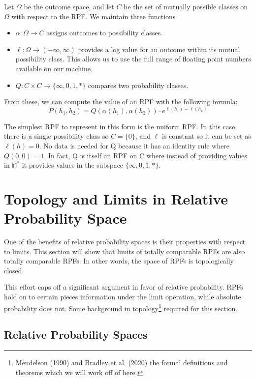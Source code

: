 \documentclass[twoside]{article}
\theoremstyle{plain}%
\theoremstyle{definition}
\theoremstyle{remark}
\begin{document}
Let \(\Omega\) be the outcome space, and let \(C\) be the set of mutually possible classes on \(\Omega\) with respect to the RPF. We maintain three functions 

\begin{itemize}
\item \(\alpha: \Omega \rightarrow C\) assigns outcomes to possibility classes.
\item \(\ell: \Omega \rightarrow (-\infty, \infty)\) provides a log value for an outcome within its mutual possibility class. This allows us to use the full range of floating point numbers available on our machine.
\item \(Q: C \times C \rightarrow \{\infty, 0, 1, \ast\}\) compares two probability classes.
\end{itemize}

From these, we can compute the value of an RPF with the following formula:
\[P(h_1, h_2) = Q(\alpha(h_1), \alpha(h_2)) \cdot e^{\ell(h_1) - \ell(h_2)}\]

The simplest RPF to represent in this form is the uniform RPF. In this case, there is a single possibility class so \(C = \{0\}\), and \(\ell\) is constant so it can be set as \(\ell(h) = 0\). No data is needed for Q because it has an identity rule where \(Q(0, 0) = 1\). In fact, Q is itself an RPF on C where instead of providing values in \(\mathbb{M}^{\ast}\) it provides values in the subspace \(\{\infty, 0, 1, \ast\}\).

\section{Topology and Limits in Relative Probability Space}
\label{section:topology}

One of the benefits of relative probability spaces is their properties with respect to limits. This section will show that limits of totally comparable RPFs are also totally comparable RPFs. In other words, the space of RPFs is topologically closed.

This effort caps off a significant argument in favor of relative probability. RPFs hold on to certain pieces information under the limit operation, while absolute probability does not. Some background in topology\footnote{Mendelson (1990) \cite{mendelson} and Bradley et al. (2020) \cite{bradley} the formal definitions and theorems which we will work off of here.} required for this section.

\subsection{Relative Probability Spaces}
\end{document}

